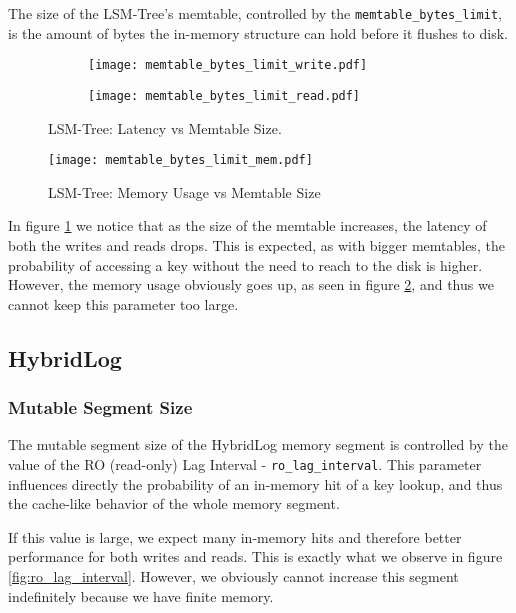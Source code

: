 The size of the LSM-Tree's memtable, controlled by the \verb"memtable_bytes_limit", is the amount of bytes the in-memory structure can hold before it flushes to disk.

\begin{figure}[h]
    \begin{subfigure}{.5\textwidth}
        \centering
        \texttt{[image: memtable\_bytes\_limit\_write.pdf]}
    \end{subfigure}
    \begin{subfigure}{.5\textwidth}
        \centering
        \texttt{[image: memtable\_bytes\_limit\_read.pdf]}
    \end{subfigure}
    \caption{LSM-Tree: Latency vs Memtable Size.}
    \label{fig:memtable-bytes-limit-write-read}
\end{figure}

\begin{figure}[h]
    \centering
    \texttt{[image: memtable\_bytes\_limit\_mem.pdf]}
    \caption{LSM-Tree: Memory Usage vs Memtable Size}
    \label{fig:memtable_bytes_limit_mem}
\end{figure}

In figure \ref{fig:memtable-bytes-limit-write-read} we notice that as the size of the memtable increases, the latency of both the writes and reads drops. This is expected, as with bigger memtables, the probability of accessing a key without the need to reach to the disk is higher. However, the memory usage obviously goes up, as seen in figure \ref{fig:memtable_bytes_limit_mem}, and thus we cannot keep this parameter too large.

\subsection{HybridLog}

\subsubsection{Mutable Segment Size}

The mutable segment size of the HybridLog memory segment is controlled by the value of the RO (read-only) Lag Interval - \verb"ro_lag_interval". This parameter influences directly the probability of an in-memory hit of a key lookup, and thus the cache-like behavior of the whole memory segment.

If this value is large, we expect many in-memory hits and therefore better performance for both writes and reads. This is exactly what we observe in figure \ref{fig:ro_lag_interval}. However, we obviously cannot increase this segment indefinitely because we have finite memory.

